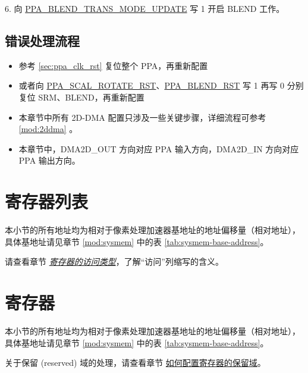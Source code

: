 \documentclass[main\_\_CN.tex]{subfiles}
\begin{document}
6. 向 \hyperref[fielddesc:PPABLENDTRANSMODEUPDATE]{PPA\_BLEND\_TRANS\_MODE\_UPDATE} 写 1 开启 BLEND 工作。

\subsection{错误处理流程}
\begin{itemize}
    \item 参考 \ref{sec:ppa_clk_rst} 复位整个 PPA，再重新配置
    \item 或者向 \hyperref[fielddesc:PPASCALROTATERST]{PPA\_SCAL\_ROTATE\_RST}、\hyperref[fielddesc:PPABLENDRST]{PPA\_BLEND\_RST} 写 1 再写 0 分别复位 SRM、BLEND，再重新配置
\end{itemize}

\begin{tiplisting}
\begin{itemize}
    \item 本章节中所有 2D-DMA 配置只涉及一些关键步骤，详细流程可参考 \ref{mod:2ddma} \textit{}。
    \item 本章节中，DMA2D\_OUT 方向对应 PPA 输入方向，DMA2D\_IN 方向对应 PPA 输出方向。
\end{itemize}
\end{tiplisting}




\newpage
\hypertarget{ppa-reg-summ}{}
\section{寄存器列表}
\label{sec:ppa-reg-summ}

本小节的所有地址均为相对于像素处理加速器基地址的地址偏移量（相对地址），具体基地址请见章节 \ref{mod:sysmem} \textit{} 中的表 \ref{tab:sysmem-base-address}。

请查看章节 \hyperref[glossary-access-types]{\textit{寄存器的访问类型}}，了解“访问”列缩写的含义。






\newpage
\section{寄存器}

本小节的所有地址均为相对于像素处理加速器基地址的地址偏移量（相对地址），具体基地址请见章节 \ref{mod:sysmem} \textit{} 中的表 \ref{tab:sysmem-base-address}。

关于保留 (reserved) 域的处理，请查看章节 \hyperref[programming-reserved-field]{如何配置寄存器的保留域}。


\end{document}
